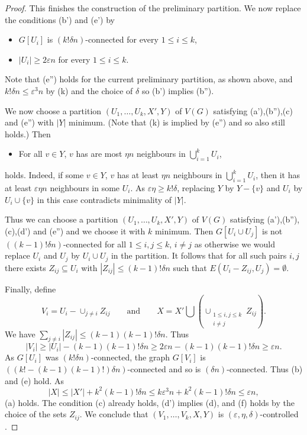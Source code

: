 \documentclass{article}
\newcommand{\eps}{\varepsilon}
\newcommand{\s}[1]{\left(#1\right)}
\begin{document}
\begin{proof}
This finishes the construction of the preliminary partition. 
We now replace the conditions (b') and (e')  by  
 \begin{itemize}
 	\item [(b'')] $G[U_i]$ is $(k! \delta n)$-connected for every $1 \leq i \leq k$,
 	\item [(e'')] $|U_i| \geq 2 \eps n$ for   every $1 \leq i \leq k$.
 \end{itemize}	Note that (e'') holds for the current preliminary partition, as shown above, and  $k! \delta n \leq \eps^3 n$ by (k) and the choice of $\delta$ so (b') implies (b''). 

We now  choose  a partition $(U_1,\ldots, U_{k}, X', Y)$ of $V(G)$ satisfying  (a'),(b''),(c) and (e'') with $|Y|$ minimum. (Note that (k) is implied by (e'') and so also still holds.) Then  \begin{itemize}
    \item[(d')] For all $v \in Y$, $v$ has are most $\eta n$ neighbours in $\bigcup_{i=1}^k U_i$,
\end{itemize} holds. Indeed, if  some $v \in Y$, $v$ has at least  $\eta n$ neighbours in $\bigcup_{i=1}^k U_i$, then it has at least $\eps \eta  n$ neighbours in some $U_i$. As $\eps \eta \geq k! \delta$, replacing $Y$ by $Y - \{v\}$ and $U_i$ by $U_i \cup \{v\}$ in this case contradicts minimality of $|Y|$.

Thus we can  choose  a partition $(U_1,\ldots, U_{k}, X', Y)$ of $V(G)$ satisfying  (a'),(b''),(c),(d') and (e'') and we choose it with $k$ minimum. 
Then $G[U_i\cup U_j]$ is not  $((k-1)! \delta n)$-connected  for all $1 \leq i, j \leq k$, $i \neq j$  as otherwise we would replace $U_i$ and $U_j$ by $U_i \cup U_j$ in the partition. It follows that for all such pairs $i,j$ there exists $Z_{ij} \subseteq U_i$ with $|Z_{ij}| \leq (k-1)!\delta n$ such that $E(U_i-Z_{ij},U_j)=\emptyset$.  

Finally, define
$$V_i = U_i - \cup_{j \neq i}Z_{ij} \qquad \mathrm{and} \qquad  X = X' \bigcup \s{\cup_{\substack{1 \leq i,j \leq k \\ i \neq j}} Z_{ij}}.$$
We have $\sum_{j \neq i}|Z_{ij}| \leq (k-1)(k-1)! \delta n$. Thus $$|V_i| \geq |U_i|-(k-1)(k-1)! \delta n \geq 2\eps n-(k-1)(k-1)! \delta n \geq \eps n.$$  As $G[U_i]$ was $(k!\delta n)$-connected,  the graph $G[V_i]$ is $((k! - (k-1)(k-1)!)\delta n)$-connected and so is $(\delta n)$-connected. Thus (b) and (e) hold. As $$|X| \leq |X'| + k^2(k-1)!\delta n \leq k \eps^3n + k^2(k-1)!\delta n \leq \eps n,$$ (a) holds. The condition (c) already holds, (d') implies (d), and (f) holds by the choice of the sets $Z_{ij}$. We conclude that  $(V_1, \ldots, V_k, X, Y)$ is $(\eps,\eta,\delta)$-controlled . 
\end{proof}
\end{document}
